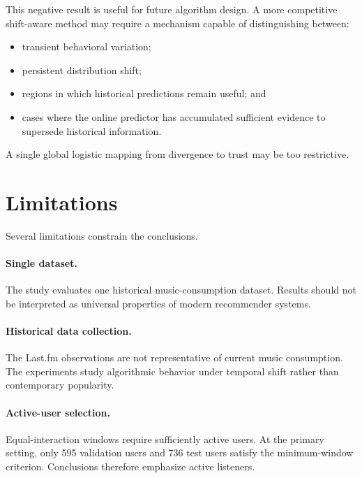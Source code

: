 \documentclass[11pt]{article}
\begin{document}
This negative result is useful for future algorithm design. A more
competitive shift-aware method may require a mechanism capable of
distinguishing between:

\begin{itemize}
    \item transient behavioral variation;
    \item persistent distribution shift;
    \item regions in which historical predictions remain useful; and
    \item cases where the online predictor has accumulated sufficient
    evidence to supersede historical information.
\end{itemize}

A single global logistic mapping from divergence to trust may be too
restrictive.


\section{Limitations}

Several limitations constrain the conclusions.

\paragraph{Single dataset.}
The study evaluates one historical music-consumption dataset. Results
should not be interpreted as universal properties of modern
recommender systems.

\paragraph{Historical data collection.}
The Last.fm observations are not representative of current music
consumption. The experiments study algorithmic behavior under temporal
shift rather than contemporary popularity.

\paragraph{Active-user selection.}
Equal-interaction windows require sufficiently active users. At the
primary setting, only 595 validation users and 736 test users satisfy
the minimum-window criterion. Conclusions therefore emphasize active
listeners.
\end{document}
